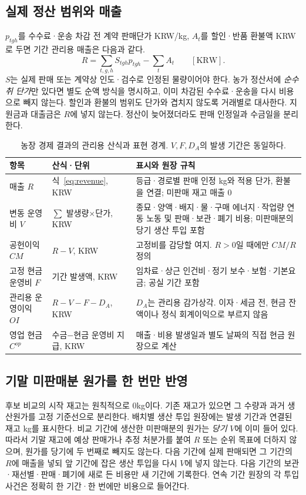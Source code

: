 \documentclass[11pt,a4paper]{article}
\begin{document}
\subsection{실제 정산 범위와 매출}
$p_{tgh}$를 수수료·운송 차감 전 계약 판매단가 KRW/kg, $A_t$를 할인·반품 환불액 KRW로 두면 기간 관리용 매출은 다음과 같다.
\begin{equation}
R=\sum_{t,g,h}S_{tgh}p_{tgh}-\sum_t A_t \qquad [\mathrm{KRW}].\label{eq:revenue}
\end{equation}
$S$는 실제 판매 또는 계약상 인도·검수로 인정된 물량이어야 한다. 농가 정산서에 \emph{순수취 단가}만 있다면 별도 순액 방식을 명시하고, 이미 차감된 수수료·운송을 다시 비용으로 빼지 않는다. 할인과 환불의 범위도 단가와 겹치지 않도록 거래별로 대사한다. 지원금과 대출금은 $R$에 넣지 않는다. 정산이 늦어졌더라도 판매 인정일과 수금일을 분리한다.

\begin{table}[htbp]
\centering\small
\caption{농장 경제 결과의 관리용 산식과 표현 경계. $V,F,D_A$의 발생 기간은 동일하다.}
\begin{tabularx}{\textwidth}{p{2.4cm}p{3.25cm}Y}
\toprule
항목 & 산식·단위 & 표시와 원장 규칙 \\
\midrule
매출 $R$ & 식~\eqref{eq:revenue}, KRW & 등급·경로별 판매 인정 kg와 적용 단가, 환불을 연결; 미판매 재고 매출 0 \\
변동 운영비 $V$ & $\sum$ 발생량$\times$단가, KRW & 종묘·양액·배지·물·구매 에너지·작업량 연동 노동 및 판매·보관·폐기 비용; 미판매분의 당기 생산 투입 포함 \\
공헌이익 $CM$ & $R-V$, KRW & 고정비를 감당할 여지. $R>0$일 때에만 $CM/R$ 정의 \\
고정 현금 운영비 $F$ & 기간 발생액, KRW & 임차료·상근 인건비·정기 보수·보험·기본요금; 공실 기간 포함 \\
관리용 운영이익 $OI$ & $R-V-F-D_A$, KRW & $D_A$는 관리용 감가상각. 이자·세금 전, 현금 잔액이나 정식 회계이익으로 부르지 않음 \\
영업 현금 $C^{op}$ & 수금$-$현금 운영비 지급, KRW & 매출·비용 발생일과 별도 날짜의 직접 현금 원장으로 계산 \\
\bottomrule
\end{tabularx}
\end{table}

\subsection{기말 미판매분 원가를 한 번만 반영}
후보 비교의 시작 재고는 원칙적으로 0kg이다. 기존 재고가 있으면 그 수량과 과거 생산원가를 고정 기준선으로 분리한다. 배치별 생산 투입 원장에는 발생 기간과 연결된 재고 kg를 표시한다. 비교 기간에 생산한 미판매분의 원가는 \emph{당기} $V$에 이미 들어 있다. 따라서 기말 재고에 예상 판매가나 추정 처분가를 붙여 $R$ 또는 순위 목표에 더하지 않으며, 원가를 당기에 두 번째로 빼지도 않는다. 다음 기간에 실제 판매되면 그 기간의 $R$에 매출을 넣되 앞 기간에 잡은 생산 투입을 다시 $V$에 넣지 않는다. 다음 기간의 보관·재선별·판매·폐기에 새로 든 비용만 새 기간에 기록한다. 연속 기간 원장의 각 투입 사건은 정확히 한 기간·한 번에만 비용으로 들어간다.
\end{document}
